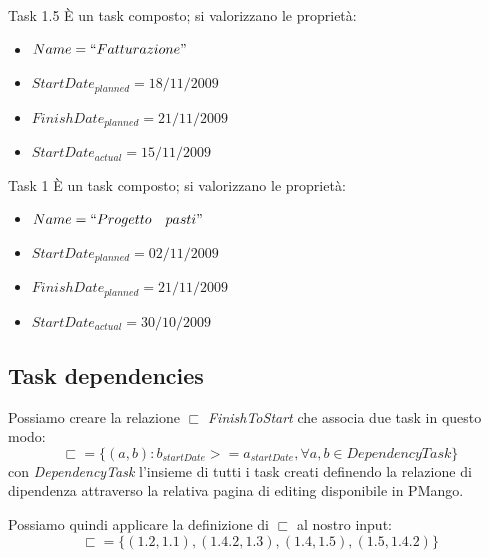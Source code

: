 \begin{taksDef}{Task 1.5} \`E un task composto; si valorizzano le
propriet\`a:
\begin{itemize}
  \item $Name = ``Fatturazione"$
  \item $StartDate_{planned} = 18/11/2009$
  \item $FinishDate_{planned} = 21/11/2009$
  \item $StartDate_{actual} = 15/11/2009$
\end{itemize}
\end{taksDef}

\begin{taksDef}{Task 1} \`E un task composto; si valorizzano le propriet\`a:
\begin{itemize}
  \item $Name = ``Progetto\quad pasti"$
  \item $StartDate_{planned} = 02/11/2009$
  \item $FinishDate_{planned} = 21/11/2009$
  \item $StartDate_{actual} = 30/10/2009$
\end{itemize}
\end{taksDef}

\subsection{Task dependencies}
Possiamo creare la relazione $\sqsubset$ \emph{FinishToStart} che associa due
task in questo modo:
\begin{displaymath}
\sqsubset = \lbrace (a,b) : b_{startDate} >= a_{startDate}, \forall a,b \in
DependencyTask
\rbrace
\end{displaymath}
con \emph{DependencyTask} l'insieme di tutti i task creati definendo la
relazione di dipendenza attraverso la relativa pagina di editing disponibile in
PMango. 

Possiamo quindi applicare la definizione di $\sqsubset$ al nostro input:
\begin{displaymath}
\sqsubset = \lbrace (1.2, 1.1), (1.4.2, 1.3), (1.4, 1.5), (1.5, 1.4.2)
\rbrace
\end{displaymath}

